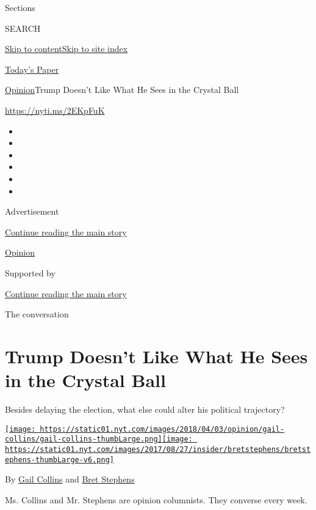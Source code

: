 Sections

SEARCH

\protect\hyperlink{site-content}{Skip to
content}\protect\hyperlink{site-index}{Skip to site index}

\href{https://myaccount.nytimes.com/auth/login?response_type=cookie\&client_id=vi}{}

\href{https://www.nytimes.com/section/todayspaper}{Today's Paper}

\href{/section/opinion}{Opinion}\textbar{}Trump Doesn't Like What He
Sees in the Crystal Ball

\url{https://nyti.ms/2EKpFuK}

\begin{itemize}
\item
\item
\item
\item
\item
\item
\end{itemize}

Advertisement

\protect\hyperlink{after-top}{Continue reading the main story}

\href{/section/opinion}{Opinion}

Supported by

\protect\hyperlink{after-sponsor}{Continue reading the main story}

The conversation

\hypertarget{trump-doesnt-like-what-he-sees-in-the-crystal-ball}{%
\section{Trump Doesn't Like What He Sees in the Crystal
Ball}\label{trump-doesnt-like-what-he-sees-in-the-crystal-ball}}

Besides delaying the election, what else could alter his political
trajectory?

\href{https://www.nytimes.com/by/gail-collins}{\texttt{[image: https://static01.nyt.com/images/2018/04/03/opinion/gail-collins/gail-collins-thumbLarge.png]}}\href{https://www.nytimes.com/by/bret-stephens}{\texttt{[image: https://static01.nyt.com/images/2017/08/27/insider/bretstephens/bretstephens-thumbLarge-v6.png]}}

By \href{https://www.nytimes.com/by/gail-collins}{Gail Collins} and
\href{https://www.nytimes.com/by/bret-stephens}{Bret Stephens}

Ms. Collins and Mr. Stephens are opinion columnists. They converse every
week.

